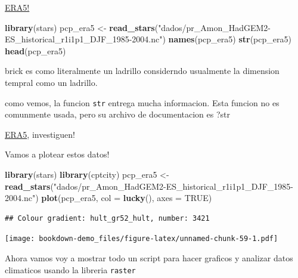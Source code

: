 \documentclass[]{book}
\newenvironment{Shaded}{\begin{snugshade}}{\end{snugshade}}
\newcommand{\DataTypeTok}[1]{\textcolor[rgb]{0.13,0.29,0.53}{#1}}
\newcommand{\KeywordTok}[1]{\textcolor[rgb]{0.13,0.29,0.53}{\textbf{#1}}}
\newcommand{\NormalTok}[1]{#1}
\newcommand{\OtherTok}[1]{\textcolor[rgb]{0.56,0.35,0.01}{#1}}
\newcommand{\StringTok}[1]{\textcolor[rgb]{0.31,0.60,0.02}{#1}}
\begin{document}
\href{https://www.ecmwf.int/en/forecasts/datasets/reanalysis-datasets/era5}{ERA5!}

\begin{Shaded}
\begin{Highlighting}[]
\KeywordTok{library}\NormalTok{(stars)}
\NormalTok{pcp_era5 <-}\StringTok{ }\KeywordTok{read_stars}\NormalTok{(}\StringTok{"dados/pr_Amon_HadGEM2-ES_historical_r1i1p1_DJF_1985-2004.nc"}\NormalTok{)}
\KeywordTok{names}\NormalTok{(pcp_era5)}
\KeywordTok{str}\NormalTok{(pcp_era5)}
\KeywordTok{head}\NormalTok{(pcp_era5)}
\end{Highlighting}
\end{Shaded}

brick es como literalmente un ladrillo considerndo usualmente la dimension tempral como un ladrillo.

como vemos, la funcion \texttt{str} entrega mucha informacion. Esta funcion no es comunmente usada, pero su archivo de documentacion es ?str

\href{https://www.ecmwf.int/en/forecasts/datasets/reanalysis-datasets/era5}{ERA5}, investiguen!

Vamos a plotear estos datos!

\begin{Shaded}
\begin{Highlighting}[]
\KeywordTok{library}\NormalTok{(stars)}
\KeywordTok{library}\NormalTok{(cptcity)}
\NormalTok{pcp_era5 <-}\StringTok{ }\KeywordTok{read_stars}\NormalTok{(}\StringTok{"dados/pr_Amon_HadGEM2-ES_historical_r1i1p1_DJF_1985-2004.nc"}\NormalTok{)}
\KeywordTok{plot}\NormalTok{(pcp_era5,}
    \DataTypeTok{col =} \KeywordTok{lucky}\NormalTok{(),}
     \DataTypeTok{axes =} \OtherTok{TRUE}\NormalTok{)}
\end{Highlighting}
\end{Shaded}

\begin{verbatim}
## Colour gradient: hult_gr52_hult, number: 3421
\end{verbatim}

\texttt{[image: bookdown-demo\_files/figure-latex/unnamed-chunk-59-1.pdf]}

Ahora vamos voy a mostrar todo un script para hacer graficos y analizar datos climaticos usando la libreria \texttt{raster}
\end{document}
